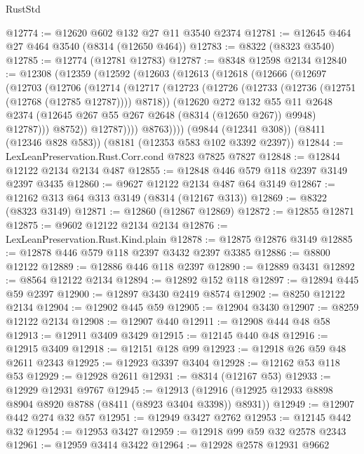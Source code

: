 \begin{lexlean}{RustStd}
\begin{coremodule}
@12774 := @12620 @602 @132 @27 @11 @3540 @2374
@12781 := @12645 @464 @27 @464 @3540 (@8314 (@12650 @464))
@12783 := @8322 (@8323 @3540)
@12785 := @12774 (@12781 @12783)
@12787 := @8348 @12598 @2134
@12840 := @12308
    (@12359
      (@12592
        (@12603
          (@12613
            (@12618
              (@12666
                (@12697
                  (@12703
                    (@12706
                      (@12714
                        (@12717
                          (@12723
                            (@12726 (@12733 (@12736 (@12751 (@12768 (@12785 @12787)))) @8718))
                            (@12620
                              @272
                              @132
                              @55
                              @11
                              @2648
                              @2374
                              (@12645 @267 @55 @267 @2648 (@8314 (@12650 @267)) @9948)
                              @12787)))
                        @8752))
                    @12787))))
            @8763))))
    (@9844 (@12341 @308))
    (@8411 (@12346 @828 @583))
    (@8181 (@12353 @583 @102 @3392 @2397))
@12844 := LexLeanPreservation.Rust.Corr.cond @7823 @7825 @7827
@12848 := @12844 @12122 @2134 @2134 @487
@12855 := @12848 @446 @579 @118 @2397 @3149 @2397 @3435
@12860 := @9627 @12122 @2134 @487 @64 @3149
@12867 := @12162 @313 @64 @313 @3149 (@8314 (@12167 @313))
@12869 := @8322 (@8323 @3149)
@12871 := @12860 (@12867 @12869)
@12872 := @12855 @12871
@12875 := @9602 @12122 @2134 @2134
@12876 := LexLeanPreservation.Rust.Kind.plain
@12878 := @12875 @12876 @3149
@12885 := @12878 @446 @579 @118 @2397 @3432 @2397 @3385
@12886 := @8800 @12122
@12889 := @12886 @446 @118 @2397
@12890 := @12889 @3431
@12892 := @8564 @12122 @2134
@12894 := @12892 @152 @118
@12897 := @12894 @445 @59 @2397
@12900 := @12897 @3430 @2419 @8574
@12902 := @8250 @12122 @2134
@12904 := @12902 @445 @59
@12905 := @12904 @3430
@12907 := @8259 @12122 @2134
@12908 := @12907 @440
@12911 := @12908 @444 @48 @58
@12913 := @12911 @3409 @3429
@12915 := @12145 @440 @48
@12916 := @12915 @3409
@12918 := @12151 @128 @99
@12923 := @12918 @26 @59 @48 @2611 @2343
@12925 := @12923 @3397 @3404
@12928 := @12162 @53 @118 @53
@12929 := @12928 @2611
@12931 := @8314 (@12167 @53)
@12933 := @12929 @12931 @9767
@12945 := @12913 (@12916 (@12925 @12933 @8898 @8904 @8920 @8788 (@8411 (@8923 @3404 @3398)) @8931))
@12949 := @12907 @442 @274 @32 @57
@12951 := @12949 @3427 @2762
@12953 := @12145 @442 @32
@12954 := @12953 @3427
@12959 := @12918 @99 @59 @32 @2578 @2343
@12961 := @12959 @3414 @3422
@12964 := @12928 @2578 @12931 @9662

\end{coremodule}
\end{lexlean}
